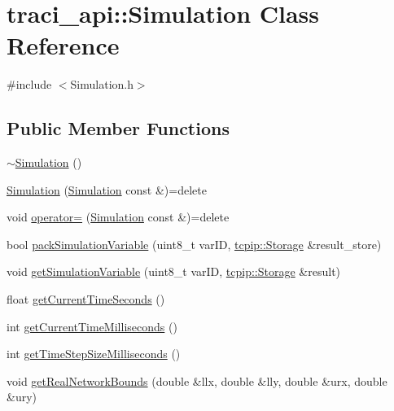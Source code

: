 \hypertarget{classtraci__api_1_1_simulation}{}\section{traci\+\_\+api\+:\+:Simulation Class Reference}
\label{classtraci__api_1_1_simulation}


{\ttfamily \#include $<$Simulation.\+h$>$}

\subsection*{Public Member Functions}
\begin{DoxyCompactItemize}
\item 
\hyperlink{classtraci__api_1_1_simulation_af0680bb9b12ef4c4d47e45f3aeebc108}{$\sim$\+Simulation} ()
\item 
\hyperlink{classtraci__api_1_1_simulation_a0e41f9a2911b8f3545002220027a9922}{Simulation} (\hyperlink{classtraci__api_1_1_simulation}{Simulation} const \&)=delete
\item 
void \hyperlink{classtraci__api_1_1_simulation_ad51b13fbeca39505efcb2171212ec99d}{operator=} (\hyperlink{classtraci__api_1_1_simulation}{Simulation} const \&)=delete
\item 
bool \hyperlink{classtraci__api_1_1_simulation_aa795b446802e3ddb196ebd29a215005e}{pack\+Simulation\+Variable} (uint8\+\_\+t var\+ID, \hyperlink{classtcpip_1_1_storage}{tcpip\+::\+Storage} \&result\+\_\+store)
\item 
void \hyperlink{classtraci__api_1_1_simulation_aa7ebe041dd0f34ccef7f2f2293775c3b}{get\+Simulation\+Variable} (uint8\+\_\+t var\+ID, \hyperlink{classtcpip_1_1_storage}{tcpip\+::\+Storage} \&result)
\item 
float \hyperlink{classtraci__api_1_1_simulation_a8e9cc88461dfab200eabf626fcdb8280}{get\+Current\+Time\+Seconds} ()
\item 
int \hyperlink{classtraci__api_1_1_simulation_a43ce3d282a312c2e6735cdcd4343b0a7}{get\+Current\+Time\+Milliseconds} ()
\item 
int \hyperlink{classtraci__api_1_1_simulation_a413eac30f40f25fabbd94cc6ff16a51c}{get\+Time\+Step\+Size\+Milliseconds} ()
\item 
void \hyperlink{classtraci__api_1_1_simulation_a1124e65809e0e3f6109654de9b28daf8}{get\+Real\+Network\+Bounds} (double \&llx, double \&lly, double \&urx, double \&ury)
\end{DoxyCompactItemize}
